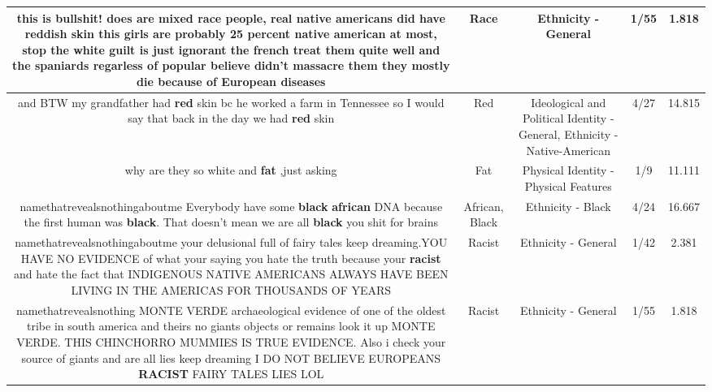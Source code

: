 \documentclass[11pt]{article}
\newlength\mylength
\begin{document}
\begin{center}
\begin{longtable}{|C{.65\mylength}|C{.30\mylength}|C{.12\mylength}|C{.12\mylength}|C{.12\mylength}|}
  \small this is bullshit! does are mixed \textbf{race} people, real native americans  did have reddish skin this girls are probably  25 percent  native  american at most, stop the white guilt  is just ignorant  the french treat them quite well and the spaniards regarless of popular believe  didn't  massacre  them they mostly die because of European  diseases\normalsize   & Race & Ethnicity - General & 1/55 & 1.818 \\  \hline
  \small and BTW my grandfather had \textbf{r\textbf{ed}} skin bc he worked a farm in Tennessee so I would say that back in the day we had \textbf{r\textbf{ed}} skin\normalsize   & Red &  Ideological and Political Identity - General, Ethnicity - Native-American & 4/27 & 14.815 \\  \hline
  \small why are they so white and \textbf{fat} ,just asking\normalsize   & Fat & Physical Identity - Physical Features & 1/9 & 11.111 \\  \hline
  \small namethatrevealsnothingaboutme Everybody have some \textbf{black} \textbf{african} DNA because the first human was \textbf{black}. That doesn't mean we are all \textbf{black} you shit for brains\normalsize   & African, Black & Ethnicity - Black & 4/24 & 16.667 \\  \hline
  \small namethatrevealsnothingaboutme your delusional full of fairy tales keep dreaming.YOU HAVE NO EVIDENCE of what your saying you hate the truth because your \textbf{racist} and hate the fact that INDIGENOUS NATIVE AMERICANS ALWAYS HAVE BEEN LIVING IN THE AMERICAS FOR THOUSANDS OF YEARS\normalsize   & Racist & Ethnicity - General & 1/42 & 2.381 \\  \hline
  \small namethatrevealsnothing MONTE VERDE archaeological evidence of one of the oldest  tribe in south america and theirs no giants objects or remains look it up MONTE VERDE. THIS CHINCHORRO MUMMIES IS TRUE EVIDENCE. Also i check your source of giants and are all lies keep dreaming I DO NOT BELIEVE EUROPEANS \textbf{RACIST}  FAIRY TALES LIES  LOL\normalsize   & Racist & Ethnicity - General & 1/55 & 1.818 \\  \hline

\end{longtable}
\end{center}
\end{document}
